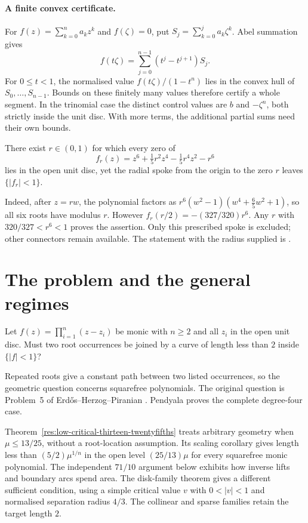 \documentclass[11pt]{article}
\begin{document}
\paragraph{A finite convex certificate.}
For $f(z)=\sum_{k=0}^n a_kz^k$ and $f(\zeta)=0$, put
$S_j=\sum_{k=0}^j a_k\zeta^k$.  Abel summation gives
\[
 f(t\zeta)=\sum_{j=0}^{n-1}(t^j-t^{j+1})S_j.
\]
For $0\le t<1$, the normalised value $f(t\zeta)/(1-t^n)$ lies in the convex
hull of $S_0,\ldots,S_{n-1}$.  Bounds on these finitely many values therefore
certify a whole segment.  In the trinomial case the distinct control values
are $b$ and $-\zeta^n$, both strictly inside the unit disc.  With more terms,
the additional partial sums need their own bounds.

\begin{proposition}
\label{res:sextic-spoke}
There exist $r\in(0,1)$ for which every zero of
\[
 f_r(z)=z^6+\tfrac15 r^2 z^4-\tfrac15 r^4 z^2-r^6
\]
lies in the open unit disc, yet the radial spoke from the origin to the zero
$r$ leaves $\{|f_r|<1\}$.
\end{proposition}

Indeed, after $z=rw$, the polynomial factors as
$r^6(w^2-1)(w^4+\tfrac65 w^2+1)$, so all six roots have modulus $r$.
However $f_r(r/2)=-(327/320)r^6$.  Any $r$ with $320/327<r^6<1$ proves the
assertion.  Only this prescribed spoke is excluded; other connectors remain
available.  The statement with the radius supplied is
.

\section{The problem and the general regimes}\label{sec:problem}

\begin{problem}[Erd\H{o}s \#1041]\label{res:problem}
Let $f(z)=\prod_{i=1}^{n}(z-z_i)$ be monic with $n\ge2$ and all
$z_i$ in the open unit disc.  Must two root occurrences be joined by a curve
of length less than $2$ inside $\{|f|<1\}$?
\end{problem}

Repeated roots give a constant path between two listed occurrences, so the
geometric question concerns squarefree polynomials.  The original question
is Problem~5 of Erd\H{o}s--Herzog--Piranian \cite[p.~139]{ehp1958}.
Pendyala \cite[Thm.~1]{june2026} proves the complete degree-four case.

Theorem~\ref{res:low-critical-thirteen-twentyfifths} treats arbitrary geometry
when $\mu\le13/25$, without a root-location assumption.  Its scaling
corollary gives length less than $(5/2)\mu^{1/n}$ in the open level
$(25/13)\mu$ for every squarefree monic polynomial.  The independent
$71/10$ argument below exhibits how inverse lifts and boundary arcs spend
area.
The disk-family theorem gives a different sufficient condition, using a
simple critical value $v$ with $0<|v|<1$ and normalised separation radius
$4/3$.  The collinear and sparse families retain the target length $2$.
\end{document}
